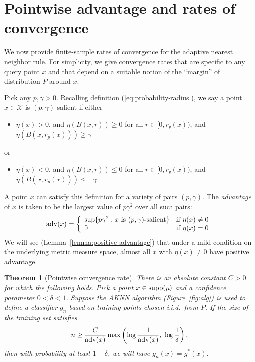 \documentclass{article}
\def\X{{\mathcal X}}
\def\supp{{\rm supp}}
\def\adv{{\rm adv}}
\newtheorem{theorem}{Theorem}
\begin{document}
\section{Pointwise advantage and rates of convergence}

We now provide finite-sample rates of convergence for the adaptive nearest neighbor rule. For simplicity, we give convergence rates that are specific to any query point $x$ and that depend on a suitable notion of the ``margin'' of distribution $P$ around $x$.

Pick any $p, \gamma > 0$. Recalling definition (\ref{eq:probability-radius}), we say a point $x \in \X$ is $(p, \gamma)$-salient if either
\begin{itemize}
\item $\eta(x) > 0$, and $\eta(B(x,r)) \geq 0$ for all $r \in [0,r_p(x))$, and $\eta(B(x,r_p(x))) \geq \gamma$
\end{itemize}
or
\begin{itemize}
\item $\eta(x) < 0$, and $\eta(B(x,r)) \leq 0$ for all $r \in [0,r_p(x))$, and $\eta(B(x,r_p(x))) \leq -\gamma$.
\end{itemize}
A point $x$ can satisfy this definition for a variety of pairs $(p,\gamma)$. The {\it advantage} of $x$ is taken to be the largest value of $p\gamma^2$ over all such pairs:
\begin{equation}
\adv(x) = 
\left\{
\begin{array}{ll}
\sup \{ p \gamma^2: \mbox{$x$ is $(p,\gamma)$-salient}\} & \mbox{if $\eta(x) \neq 0$} \\
0 & \mbox{if $\eta(x) = 0$}
\end{array}
\right.
\label{eq:advantage}
\end{equation}
We will see (Lemma~\ref{lemma:positive-advantage}) that under a mild condition on the underlying metric measure space, almost all $x$ with $\eta(x) \neq 0$ have positive advantage.

\begin{theorem}[Pointwise convergence rate]
There is an absolute constant $C > 0$ for which the following holds. Pick a point $x \in \supp(\mu)$ and a confidence parameter $0 < \delta < 1$. Suppose the AKNN algorithm (Figure~\ref{fig:alg}) is used to define a classifier $g_n$ based on training points chosen i.i.d.\ from $P$. If the size of the training set satisfies 
$$ n \geq \frac{C}{\adv(x)} \max \left( \log \frac{1}{\adv(x)}, \ \log \frac{1}{\delta} \right),$$
then with probability at least $1-\delta$, we will have $g_n(x) = g^*(x)$.
\label{thm:pointwise-rate}
\end{theorem}
\end{document}
